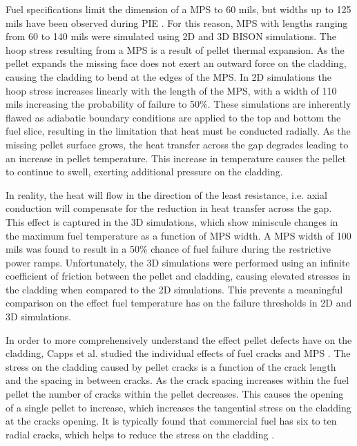 \documentclass[edeposit,fullpage,11pt]{uiucthesis2009}
\begin{document}
Fuel specifications limit the dimension of a \gls{MPS} to 60 mils, but widths up to 125 mils have been observed during \gls{PIE} \cite{aleshin_effect_2010}.
For this reason, \gls{MPS} with lengths ranging from 60 to 140 mils were simulated using 2D and 3D BISON simulations. 
The hoop stress resulting from a \gls{MPS} is a result of pellet thermal expansion. 
As the pellet expands the missing face does not exert an outward force on the cladding, causing the cladding to bend at the edges of the \gls{MPS}.
In 2D simulations the hoop stress increases linearly with the length of the \gls{MPS}, with a width of 110 mils increasing the probability of failure to 50\%.
These simulations are inherently flawed as adiabatic boundary conditions are applied to the top and bottom the fuel slice, resulting in the limitation that heat must be conducted radially.
As the missing pellet surface grows, the heat transfer across the gap degrades leading to an increase in pellet temperature.
This increase in temperature causes the pellet to continue to swell, exerting additional pressure on the cladding.

In reality, the heat will flow in the direction of the least resistance, i.e. axial conduction will compensate for the reduction in heat transfer across the gap.
This effect is captured in the 3D simulations, which show miniscule changes in the maximum fuel temperature as a function of \gls{MPS} width.
A \gls{MPS} width of 100 mils was found to result in a 50\% chance of fuel failure during the restrictive power ramps.
Unfortunately, the 3D simulations were performed using an infinite coefficient of friction between the pellet and cladding, causing elevated stresses in the cladding when compared to the 2D simulations.
This prevents a meaningful comparison on the effect fuel temperature has on the failure thresholds in 2D and 3D simulations.


In order to more comprehensively understand the effect pellet defects have on the cladding, Capps et al. studied the individual effects of fuel cracks and \gls{MPS} \cite{capps_evaluation_2016}.
The stress on the cladding caused by pellet cracks is a function of the crack length and the spacing in between cracks.
As the crack spacing increases within the fuel pellet the number of cracks within the pellet decreases.
This causes the opening of a single pellet to increase, which increases the tangential stress on the cladding at the cracks opening.
It is typically found that commercial fuel has six to ten radial cracks, which helps to reduce the stress on the cladding \cite{oguma_cracking_1983}. 
\end{document}
